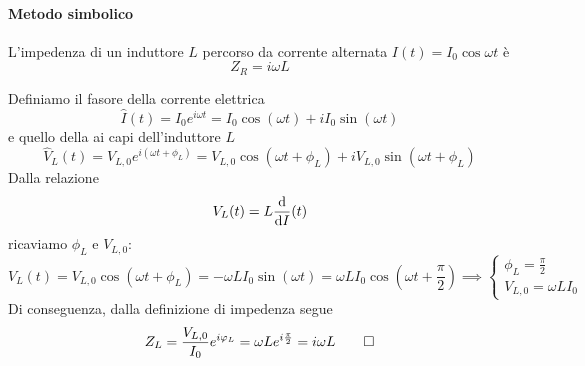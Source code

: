 \paragraph{Metodo simbolico}
\begin{proposition}
	L'impedenza di un induttore $L$ percorso da corrente alternata $I(t)=I_0\cos\omega t$ è
	\begin{equation}
		Z_R=i\omega L
	\end{equation}
\end{proposition}
\begin{demonstration} %
	Definiamo il fasore della corrente elettrica
	\begin{equation*}
		\hat{I}(t)=I_0e^{i\omega t}=I_0\cos(\omega t)+iI_0\sin(\omega t)
	\end{equation*}
	e quello della \ddp ai capi dell'induttore $L$
	\begin{equation*}
		\hat{V}_L(t)=V_{L,0}e^{i(\omega t+\phi_L)}=V_{L,0}\cos(\omega t+\phi_L)+iV_{L,0}\sin(\omega t+\phi_L)
	\end{equation*}
	Dalla relazione
	\begin{equation*}
		V_L(t)=L\dv{I}(t)
	\end{equation*}
	ricaviamo $\phi_L$ e $V_{L,0}$:
	\begin{equation*}
		V_L(t)=V_{L,0}\cos(\omega t+\phi_L)=-\omega L I_0\sin(\omega t)=\omega L I_0\cos(\omega t+\frac{\pi}{2})\implies \begin{cases}
			\phi_L=\frac{\pi}{2}\\
			V_{L,0}=\omega L I_0
		\end{cases} 
	\end{equation*}
	Di conseguenza, dalla definizione di impedenza segue
	\begin{equation*}
		Z_L=\frac{V_{L,0}}{I_0}e^{i\oldphi_L}=\omega Le^{i\frac{\pi}{2}}=i\omega L\qedhere
	\end{equation*}
\end{demonstration}

